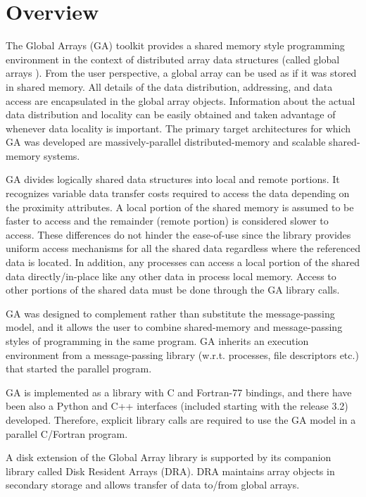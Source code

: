 
\section{Overview}

The Global Arrays (GA) toolkit provides a shared memory style programming
environment in the context of distributed array data structures (called
\textquotedbl{}global arrays\textquotedbl{} ). From the user perspective,
a global array can be used as if it was stored in shared memory. All
details of the data distribution, addressing, and data access are
encapsulated in the global array objects. Information about the actual
data distribution and locality can be easily obtained and taken advantage
of whenever data locality is important. The primary target architectures
for which GA was developed are massively-parallel distributed-memory
and scalable shared-memory systems. 

GA divides logically shared data structures into \textquotedbl{}local\textquotedbl{}
and \textquotedbl{}remote\textquotedbl{} portions. It recognizes variable
data transfer costs required to access the data depending on the proximity
attributes. A local portion of the shared memory is assumed to be
faster to access and the remainder (remote portion) is considered
slower to access. These differences do not hinder the ease-of-use
since the library provides uniform access mechanisms for all the shared
data regardless where the referenced data is located. In addition,
any processes can access a local portion of the shared data directly/in-place
like any other data in process local memory. Access to other portions
of the shared data must be done through the GA library calls. 

GA was designed to complement rather than substitute the message-passing
model, and it allows the user to combine shared-memory and message-passing
styles of programming in the same program. GA inherits an execution
environment from a message-passing library (w.r.t. processes, file
descriptors etc.) that started the parallel program. 

GA is implemented as a library with C and Fortran-77 bindings, and
there have been also a Python and C++ interfaces (included starting
with the release 3.2) developed. Therefore, explicit library calls
are required to use the GA model in a parallel C/Fortran program. 

A disk extension of the Global Array library is supported by its companion
library called Disk Resident Arrays (DRA). DRA maintains array objects
in secondary storage and allows transfer of data to/from global arrays. 


